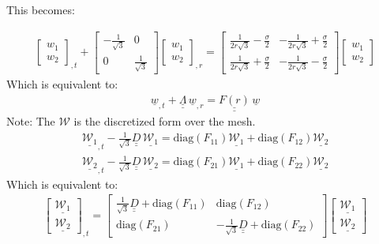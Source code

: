 \documentclass[12pt]{article}
\newcommand{\bunderline}[1]{\underline{#1}}
\renewcommand{\vec}[1]{{\bunderline{#1}}}
\newcommand{\mat}[1]{{\bunderline{\bunderline{#1}}}}
\begin{document}
This becomes:

\begin{align*}
\begin{bmatrix}
w_1 \\
w_2
\end{bmatrix} _{,t}
+ 
\begin{bmatrix}
-\frac{1}{\sqrt{3}} & 0 \\
0 & \frac{1}{\sqrt{3}}
\end{bmatrix}
\begin{bmatrix}
w_1 \\
w_2
\end{bmatrix} _{,r}
=
\begin{bmatrix}
\frac{1}{2r\sqrt{3}} - \frac{\sigma}{2} & -\frac{1}{2r\sqrt{3}} + \frac{\sigma}{2} \\
\frac{1}{2r\sqrt{3}} + \frac{\sigma}{2} & -\frac{1}{2r\sqrt{3}} - \frac{\sigma}{2}
\end{bmatrix}
\begin{bmatrix}
w_1 \\
w_2
\end{bmatrix}
\end{align*}
Which is equivalent to:
\begin{align*}
\vec{w}_{,t} + \mat{\Lambda} \, \vec{w}_{,r} = \mat{F(r)} \, \vec{w}
\end{align*}
Note: The $\mathcal{W}$ is the discretized form over the mesh.
\begin{align*}
\vec{\mathcal{W}_1}_{,t} - \frac{1}{\sqrt{3}} \mat{D} \, \vec{\mathcal{W}_1} = \text{diag}(F_{11}) \vec{\mathcal{W}_1} + \text{diag}(F_{12})\vec{\mathcal{W}_2} \\
\vec{\mathcal{W}_2}_{,t} - \frac{1}{\sqrt{3}} \mat{D} \, \vec{\mathcal{W}_2} = \text{diag}(F_{21}) \vec{\mathcal{W}_1} + \text{diag}(F_{22})\vec{\mathcal{W}_2}
\end{align*}
Which is equivalent to:
\begin{align*}
\begin{bmatrix}
\vec{\mathcal{W}_1} \\
\vec{\mathcal{W}_2}
\end{bmatrix} _{,t}
=
\begin{bmatrix}
\frac{1}{\sqrt{3}} \mat{D} + \text{diag}(F_{11}) & \text{diag}(F_{12}) \\
\text{diag}(F_{21}) & -\frac{1}{\sqrt{3}} \mat{D} + \text{diag}(F_{22})
\end{bmatrix}
\begin{bmatrix}
\vec{\mathcal{W}_1} \\
\vec{\mathcal{W}_2}
\end{bmatrix} 
\end{align*}
\end{document}
